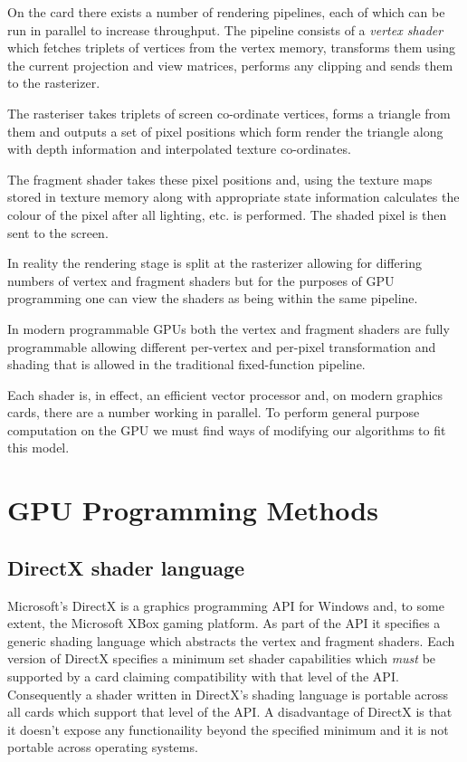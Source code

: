 On the card there exists a number of rendering pipelines, each of which
can be run in parallel to increase throughput. The pipeline consists
of a \emph{vertex shader} which fetches triplets of vertices from
the vertex memory, transforms them using the current projection and 
view matrices, performs any clipping and sends them to the rasterizer.

The rasteriser takes triplets of screen co-ordinate vertices, forms
a triangle from them and outputs a set of pixel positions which form
render the triangle along with depth information and interpolated texture
co-ordinates. 

The fragment shader takes these pixel positions and, using the texture maps
stored in texture memory along with appropriate state information calculates
the colour of the pixel after all lighting, etc. is performed. The shaded pixel
is then sent to the screen.

In reality the rendering stage is split at the rasterizer allowing for differing
numbers of vertex and fragment shaders but for the purposes of GPU programming
one can view the shaders as being within the same pipeline.

In modern programmable GPUs both the vertex and fragment shaders are fully 
programmable allowing different per-vertex and per-pixel transformation
and shading that is allowed in the traditional fixed-function pipeline.

Each shader is, in effect, an efficient vector processor and, on modern 
graphics cards, there are a number working in parallel. To perform
general purpose computation on the GPU we must find ways of modifying our
algorithms to fit this model.

\section{GPU Programming Methods}

\subsection{DirectX shader language}

Microsoft's DirectX\cite{GPU:DirectX} is a graphics programming API for
Windows and, to some extent, the Microsoft XBox gaming platform. As part of
the API it specifies a generic shading language\cite{GPU:DirectXShadingLanguage}
which abstracts the vertex and fragment shaders. Each version of DirectX
specifies a minimum set shader capabilities which \emph{must} be supported by a 
card claiming compatibility with that level of the API. Consequently a shader written in
DirectX's shading language is portable across all cards which support that level
of the API. A disadvantage of DirectX is that it doesn't expose any functionaility
beyond the specified minimum and it is not portable across operating systems.

